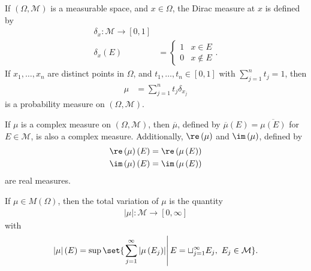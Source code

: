 \begin{definition}
  If $\left(\Omega,\mathcal{M}\right)$ is a measurable space, and $x\in \Omega$, the Dirac measure at $x$ is defined by
  \begin{align*}
    \delta_{x}: \mathcal{M}\rightarrow [0,1]\\
    \delta_x\left(E\right) &= \begin{cases}
      1 & x\in E\\
      0 & x\notin E
    \end{cases}.
  \end{align*}
    If $x_1,\dots,x_n$ are distinct points in $\Omega$, and $t_1,\dots,t_n\in [0,1]$ with $\sum_{j=1}^{n}t_j = 1$, then
    \begin{align*}
      \mu &= \sum_{j=1}^{n}t_j\delta_{x_j}
    \end{align*}
    is a probability measure on $\left(\Omega,\mathcal{M}\right)$.
\end{definition}
\begin{fact}
  If $\mu$ is a complex measure on $\left(\Omega,\mathcal{M}\right)$, then $\overline{\mu}$, defined by $\overline{\mu}\left(E\right) = \overline{\mu\left(E\right)}$ for $E\in \mathcal{M}$, is also a complex measure. Additionally, $\re\left(\mu\right)$ and $\im\left(\mu\right)$, defined by
  \begin{align*}
    \re\left(\mu\right)\left(E\right) &= \re\left(\mu\left(E\right)\right)\\
    \im\left(\mu\right)\left(E\right) &= \im\left(\mu\left(E\right)\right)
  \end{align*}
  are real measures.
\end{fact}
\begin{definition}
  If $\mu\in M\left(\Omega\right)$, then the total variation of $\mu$ is the quantity
  \begin{align*}
    \left\vert \mu \right\vert: \mathcal{M}\rightarrow [0,\infty]
    \end{align*}
    with
    \begin{align*}
    \left\vert \mu \right\vert\left(E\right) = \sup\set{\left.\sum_{j=1}^{\infty}\left\vert \mu\left(E_j\right) \right\vert\right|E = \sqcup_{j=1}^{\infty}E_j,~E_j\in\mathcal{M}}.
  \end{align*}
\end{definition}
